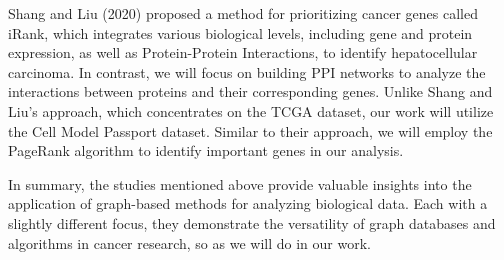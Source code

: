 Shang and Liu (2020) \cite{shan2020network} proposed a method for prioritizing cancer genes called iRank,
which integrates various biological levels, including gene and protein expression, as well as Protein-Protein Interactions,
to identify hepatocellular carcinoma.
In contrast, we will focus on building PPI networks to analyze the interactions between proteins and their corresponding genes.
Unlike Shang and Liu's approach, which concentrates on the TCGA dataset, our work will utilize the Cell Model Passport dataset.
Similar to their approach, we will employ the PageRank algorithm to identify important genes in our analysis.

In summary, the studies mentioned above provide valuable insights into the application of graph-based methods for analyzing biological data.
Each with a slightly different focus, they demonstrate the versatility of graph databases and algorithms in cancer research,
so as we will do in our work.\\
